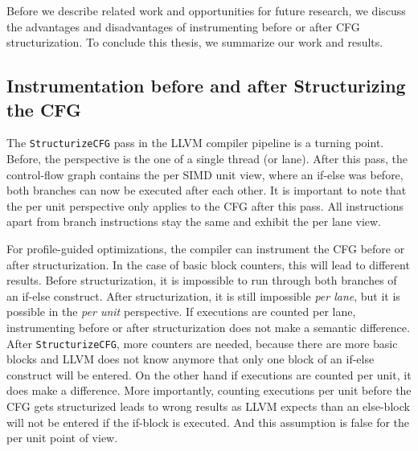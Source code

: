 \clearpage
{}
\label{sec:discussion}
Before we describe related work and opportunities for future research, we discuss the advantages and disadvantages of instrumenting before or after CFG structurization.
To conclude this thesis, we summarize our work and results.

\subsection{Instrumentation before and after Structurizing the CFG}
\label{sub:discussion_structurize}
The \texttt{StructurizeCFG} pass in the LLVM compiler pipeline is a turning point. Before, the perspective is the one of a single thread (or lane).
After this pass, the control-flow graph contains the per SIMD unit view, where an if-else was before, both branches can now be executed after each other.
It is important to note that the per unit perspective only applies to the CFG after this pass. All instructions apart from branch instructions stay the same and exhibit the per lane view.

For profile-guided optimizations, the compiler can instrument the CFG before or after structurization. In the case of basic block counters, this will lead to different results.
Before structurization, it is impossible to run through both branches of an if-else construct. After structurization, it is still impossible \emph{per lane}, but it is possible in the \emph{per unit} perspective.
If executions are counted per lane, instrumenting before or after structurization does not make a semantic difference.
After \texttt{StructurizeCFG}, more counters are needed, because there are more basic blocks and LLVM does not know anymore that only one block of an if-else construct will be entered.
On the other hand if executions are counted per unit, it does make a difference. More importantly, counting executions per unit before the CFG gets structurized leads to wrong results as LLVM expects than an else-block will not be entered if the if-block is executed. And this assumption is false for the per unit point of view.

